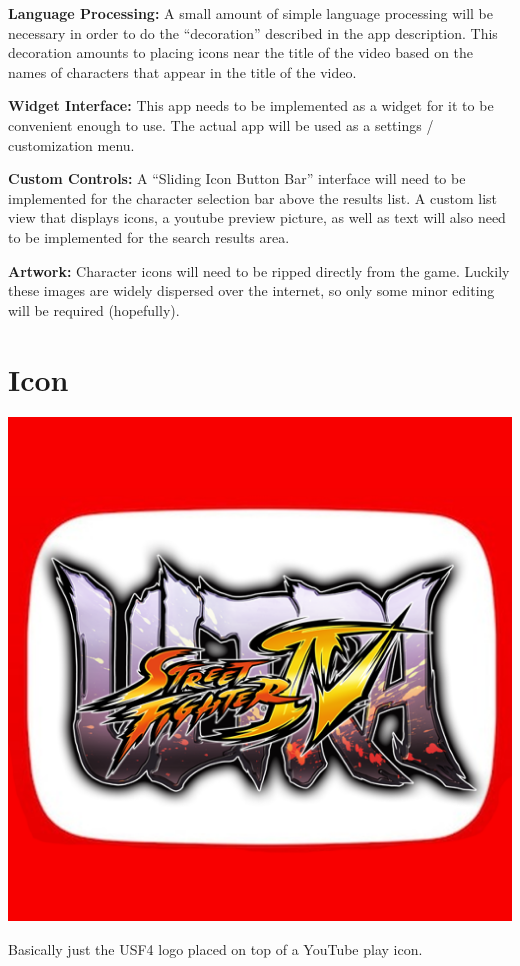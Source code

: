 \documentclass[10pt,letterpaper,final]{article}
\begin{document}
\textbf{Language Processing:} A small amount of simple language processing will be necessary in order to do the ``decoration'' described in the app description. This decoration amounts to placing icons near the title of the video based on the names of characters that appear in the title of the video.

\textbf{Widget Interface:} This app needs to be implemented as a widget for it to be convenient enough to use. The actual app will be used as a settings / customization menu.

\textbf{Custom Controls:} A ``Sliding Icon Button Bar'' interface will need to be implemented for the character selection bar above the results list. A custom list view that displays icons, a youtube preview picture, as well as text will also need to be implemented for the search results area.

\textbf{Artwork:} Character icons will need to be ripped directly from the game. Luckily these images are widely dispersed over the internet, so only some minor editing will be required (hopefully).

\pagebreak
\section*{Icon}

\centerline{\includegraphics[scale=0.5]{icon.png}}

Basically just the USF4 logo placed on top of a YouTube play icon.
\end{document}
